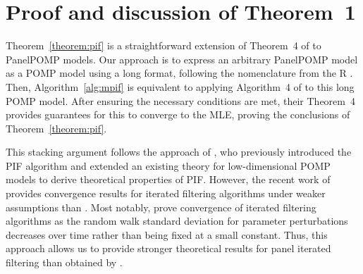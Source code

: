  \section{Proof and discussion of Theorem~1}\label{sec:panelTheory}
 
  Theorem~\ref{theorem:pif} is a straightforward extension of Theorem~4 of \citet{chen24} to PanelPOMP models. 
  Our approach is to express an arbitrary PanelPOMP model as a POMP model using a long format, following the nomenclature from the R  \citep{wickham19}.
  Then, Algorithm~\ref{alg:mpif} is equivalent to applying Algorithm~4 of \citet{chen24} to this long POMP model.
  After ensuring the necessary conditions are met, their Theorem~4 provides guarantees for this to converge to the MLE, proving the conclusions of Theorem~\ref{theorem:pif}. 
  
  This stacking argument follows the approach of \citet{breto20}, who previously introduced the PIF algorithm and extended an existing theory for low-dimensional POMP models \citep{ionides15} to derive theoretical properties of PIF. 
  However, the recent work of \citet{chen24} provides convergence results for iterated filtering algorithms under weaker assumptions than \citet{ionides15}.
  Most notably, \citet{chen24} prove convergence of iterated filtering algorithms as the random walk standard deviation for parameter perturbations decreases over time rather than being fixed at a small constant.
  Thus, this approach allows us to provide stronger theoretical results for panel iterated filtering than obtained by \citet{breto20}.
  
